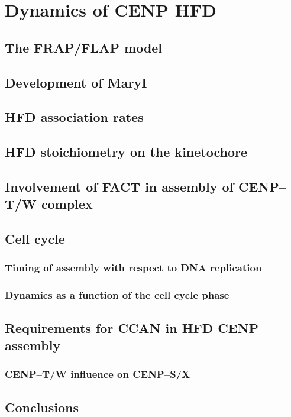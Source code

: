 \chapter{Dynamics of CENP HFD}
\label{ch:cenp}

\section{The FRAP/FLAP model}
\section{Development of MaryI}
\section{HFD association rates}
\section{HFD stoichiometry on the kinetochore}
\section{Involvement of FACT in assembly of CENP–T/W complex}
\section{Cell cycle}
  \subsection{Timing of assembly with respect to DNA replication}
  \subsection{Dynamics as a function of the cell cycle phase}
\section{Requirements for CCAN in HFD CENP assembly}
  \subsection{CENP–T/W influence on CENP–S/X}
\section{Conclusions}
